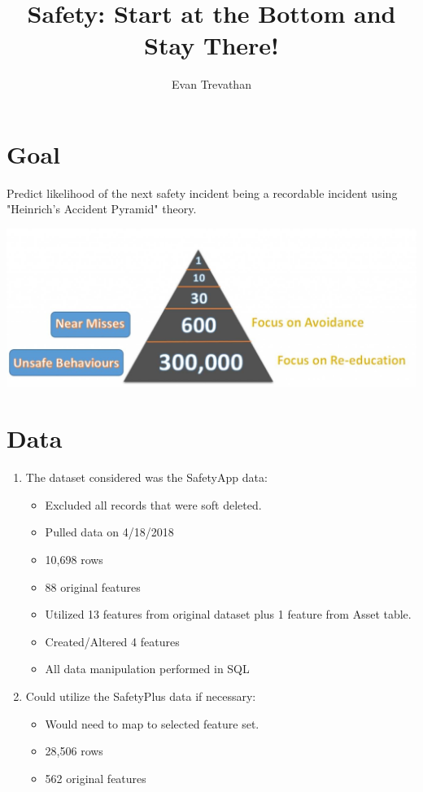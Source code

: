 \documentclass{article}
\title{Safety: Start at the  Bottom and Stay There!}
\author{Evan Trevathan}
\date{}
\begin{document}
\maketitle 
\section*{Goal} 
Predict likelihood of the next safety incident being a recordable incident using "Heinrich's Accident Pyramid" theory.
\begin{center}
\includegraphics[scale=.65]{SafetyTriangle.jpg}
\end{center}
\section*{Data} 
\begin{enumerate}
	\item The dataset considered was the SafetyApp data:
	\begin{itemize}
		\item Excluded all records that were soft deleted.
		\item Pulled data on 4/18/2018
		\item 10,698 rows
		\item 88 original features
		\item Utilized 13 features from original dataset plus 1 feature from Asset table.
		\item Created/Altered 4 features
		\item All data manipulation performed in SQL
	\end{itemize}
	\item Could utilize the SafetyPlus data if necessary:
	\begin{itemize}
		\item Would need to map to selected feature set.
		\item 28,506 rows
		\item 562 original features
	\end{itemize}
\end{enumerate}
\end{document}
